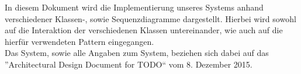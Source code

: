 In diesem Dokument wird die Implementierung unseres Systems anhand verschiedener Klassen-, sowie Sequenzdiagramme dargestellt. Hierbei wird sowohl auf die Interaktion der verschiedenen Klassen untereinander, wie auch auf die hierfür verwendeten Pattern eingegangen.\\
Das System, sowie alle Angaben zum System, beziehen sich dabei auf das ”Architectural Design Document for TODO“ vom 8. Dezember 2015.